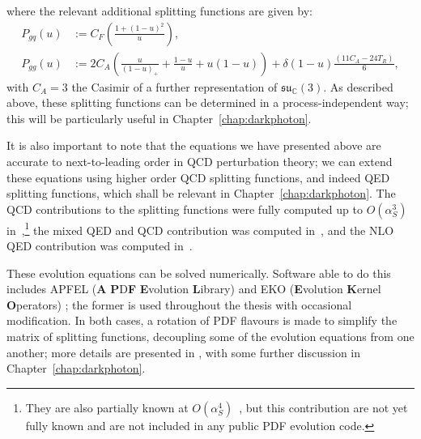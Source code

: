 \documentclass[withindex,glossary]{cam-thesis}
\begin{document}
where the relevant additional splitting functions are given by:
\begin{align}
P_{gq}(u) &:= C_F \left( \frac{1 + (1-u)^2}{u} \right),\\[1.5ex]
P_{gg}(u) &:= 2 C_A \left( \frac{u}{(1-u)_+} + \frac{1-u}{u} + u(1-u) \right) + \delta(1-u) \frac{(11C_A - 24 T_R)}{6},
\end{align}
with $C_A = 3$ the Casimir of a further representation of $\mathfrak{su}_\mathbb{C}(3)$. As described above, these splitting functions can be determined in a process-independent way; this will be particularly useful in Chapter~\ref{chap:darkphoton}.

It is also important to note that the equations we have presented above are accurate to next-to-leading order in QCD perturbation theory; we can extend these equations using higher order QCD splitting functions, and indeed QED splitting functions, which shall be relevant in Chapter~\ref{chap:darkphoton}. The QCD contributions
to the splitting functions were fully computed up to $O(\alpha_S^3)$
in~\cite{Vogt:2004mw,Moch:2004pa,Blumlein:2021enk},\footnote{They are also partially
  known at $O(\alpha_S^4)$~\cite{Moch:2021qrk}, but this contribution
  are not yet fully known and are not included in any public 
PDF evolution code.} the mixed QED and QCD contribution
was computed in~\cite{deFlorian:2015ujt}, and the NLO QED contribution was computed in~\cite{deFlorian:2016gvk}.

These evolution equations can be solved numerically. Software able to do this includes APFEL (\textbf{A} \textbf{P}D\textbf{F} \textbf{E}volution \textbf{L}ibrary) \cite{Bertone:2013vaa} and EKO (\textbf{E}volution \textbf{K}ernel \textbf{O}perators) \cite{Candido:2022tld}; the former is used throughout the thesis with occasional modification. In both cases, a rotation of PDF flavours is made to simplify the matrix of splitting functions, decoupling some of the evolution equations from one another; more details are presented in \cite{Bertone:2013vaa}, with some further discussion in Chapter~\ref{chap:darkphoton}.
\end{document}
